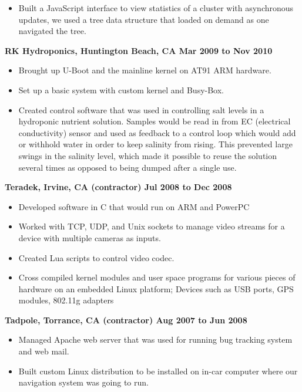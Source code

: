 \documentclass{res}
\begin{document}
\begin{resume}
\begin{itemize}
\item Built a JavaScript interface to view statistics of a cluster with
asynchronous updates, we used a tree data structure that loaded on demand
as one navigated the tree.

\end{itemize}

{\large \bf RK Hydroponics, Huntington Beach, CA \hfill Mar 2009 to Nov
2010} \begin{itemize}

\item Brought up U-Boot and the mainline kernel on AT91 ARM hardware.

\item Set up a basic system with custom kernel and Busy-Box.

\item Created control software that was used in controlling salt levels
in a hydroponic nutrient solution.  Samples would be read in from EC
(electrical conductivity) sensor and used as feedback to a control loop
which would add or withhold water in order to keep salinity from rising.
This prevented large swings in the salinity level, which made it possible
to reuse the solution several times as opposed to being dumped after a
single use.

\end{itemize}

{\large \bf Teradek, Irvine, CA (contractor) \hfill Jul 2008 to Dec 2008}
\begin{itemize}
\item Developed software in C that would run on ARM and PowerPC
\item Worked with TCP, UDP, and Unix sockets to manage video streams for
a device with multiple cameras as inputs.
\item Created Lua scripts to control video codec.
\item Cross compiled kernel modules and user space programs for various
pieces of hardware on an embedded Linux platform; Devices such as USB
ports, GPS modules, 802.11g adapters
\end{itemize}

{\large \bf Tadpole, Torrance, CA (contractor) \hfill Aug 2007 to Jun 2008}
\begin{itemize}

\item Managed Apache web server that was used for running bug
tracking system and web mail.

\item Built custom Linux distribution to be installed on in-car
computer where our navigation system was going to run.


\end{itemize}
\end{resume}
\end{document}
